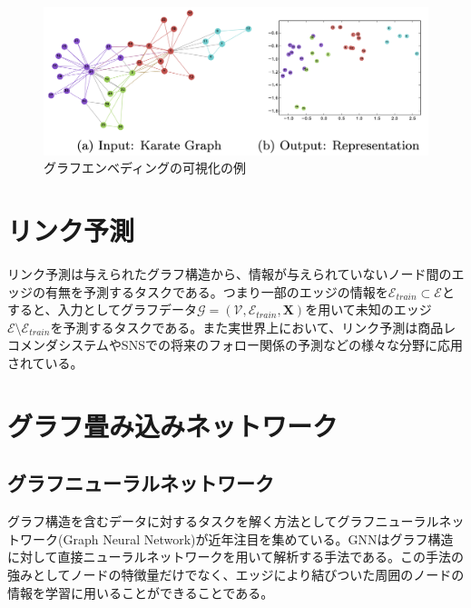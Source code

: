 \begin{figure}[tb]
  \centering
  \includegraphics[width=0.8\hsize]{figures/embedding.pdf}
  \caption{グラフエンベディングの可視化の例\cite{Perozzi2014deep}}
  \label{fig:embedding}
\end{figure}

\section{リンク予測}
リンク予測は与えられたグラフ構造から、情報が与えられていないノード間のエッジの有無を予測するタスクである。つまり一部のエッジの情報を$\mathcal{E}_{train} \subset \mathcal{E}$とすると、入力としてグラフデータ$\mathcal{G} = ({\mathcal{V}}, \mathcal{E}_{train}, \mathbf{X})$を用いて未知のエッジ$\mathcal{E} \setminus \mathcal{E}_{train}$を予測するタスクである。また実世界上において、リンク予測は商品レコメンダシステム\cite{ZhouBipartiteNetProjection}やSNSでの将来のフォロー関係の予測などの様々な分野に応用されている。


\section{グラフ畳み込みネットワーク}
\subsection{グラフニューラルネットワーク}
グラフ構造を含むデータに対するタスクを解く方法としてグラフニューラルネットワーク(Graph Neural Network)\cite{scarselli2008gnn_model}が近年注目を集めている。GNNはグラフ構造に対して直接ニューラルネットワークを用いて解析する手法である\cite{Wu2019survey_gnn}。この手法の強みとしてノードの特徴量だけでなく、エッジにより結びついた周囲のノードの情報を学習に用いることができることである。

